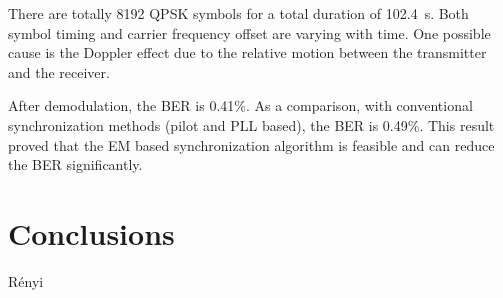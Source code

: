 \documentclass[journal,comsoc]{IEEEtran}
\begin{document}
There are totally 8192 QPSK symbols for a total duration of 102.4~s.
Both symbol timing and carrier frequency offset are varying with time.
One possible cause is the Doppler effect due to the relative motion between the transmitter and the receiver.

After demodulation, the BER is 0.41\%.
As a comparison, with conventional synchronization methods (pilot and PLL based), the BER is 0.49\%.
This result proved that the EM based synchronization algorithm is feasible and can reduce the BER significantly.



\section{Conclusions}
\label{sec:conc}
R\'enyi
\small


\end{document}
